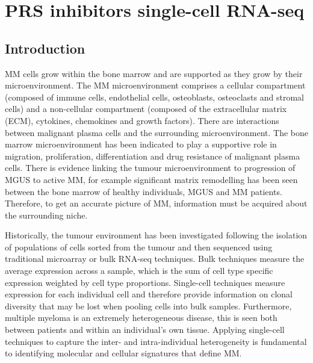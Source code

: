 \chapter{\label{ch:6-sc}PRS inhibitors single-cell RNA-seq}


\section{Introduction}
MM cells grow within the bone marrow and are supported as they grow by their microenvironment.
The MM microenvironment comprises a cellular compartment (composed of immune cells, endothelial cells, osteoblasts, osteoclasts and stromal cells) and a non-cellular compartment (composed of the extracellular matrix (ECM), cytokines, chemokines and growth factors)\cite{manier2012bone, kawano2015targeting}.
There are interactions between malignant plasma cells and the surrounding microenvironment.
The bone marrow microenvironment has been indicated to play a supportive role in migration, proliferation, differentiation and drug resistance of malignant plasma cells.
There is evidence linking the tumour microenvironment to progression of MGUS to active MM, for example significant matrix remodelling has been seen between the bone marrow of healthy individuals, MGUS and MM patients\cite{kawano2015targeting}.
Therefore, to get an accurate picture of MM, information must be acquired about the surrounding niche.

Historically, the tumour environment has been investigated following the isolation of populations of cells sorted from the tumour and then sequenced using traditional microarray or bulk RNA-seq techniques.
Bulk techniques measure the average expression across a sample, which is the sum of cell type specific expression weighted by cell type proportions.
Single-cell techniques measure expression for each individual cell and therefore provide information on clonal diversity that may be lost when pooling cells into bulk samples.
Furthermore, multiple myeloma is an extremely heterogeneous disease, this is seen both between patients and within an individual's own tissue.
Applying single-cell techniques to capture the inter- and intra-individual heterogeneity is fundamental to identifying molecular and cellular signatures that define MM\@.

